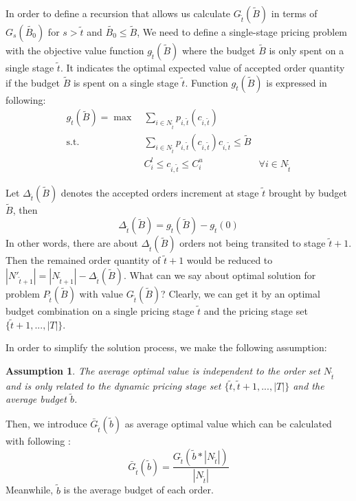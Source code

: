\documentclass[sigconf,authordraft]{acmart}
\begin{document}
  In order to define a recursion that allows us calculate $G_{\tilde{t}}(\tilde{B})$ in terms of $G_{s}(\tilde{B_0})$ for $s>\tilde{t}$ and $\tilde{B_0} \le \tilde{B}$, We need to define a single-stage pricing problem with the objective value function $g_{\tilde{t}}(\tilde{B})$ where the budget $\tilde{B}$ is only spent on a single stage $\tilde{t}$. It indicates the optimal expected value of accepted order quantity if the budget $\tilde{B}$ is spent on a single stage $\tilde{t}$. Function $g_{\tilde{t}}(\tilde{B})$ is expressed in following:
\begin{align}
    \label{eq3.1}g_{\tilde{t}}(\tilde{B})= \max~& \sum_{i\in N_{\tilde{t}}}p_{i,\tilde{t}}(c_{i,\tilde{t}}) \\
    \label{eq3.2}\mbox{s.t. }& \sum_{i\in N_{\tilde{t}}}p_{i,\tilde{t}}(c_{i,\tilde{t}})c_{i,\tilde{t}}\le \tilde{B}\\
    \label{eq3.3}& C_i^l\le c_{i,\tilde{t}}\le C_i^u & \forall i \in N_{\tilde{t}}
\end{align}


Let $\Delta_{\tilde{t}}(\tilde{B})$ denotes the accepted orders increment at stage $\tilde{t}$ brought by budget $\tilde{B}$, then
\begin{equation}
    \Delta_{\tilde{t}}(\tilde{B})=g_{\tilde{t}}(\tilde{B})-g_{\tilde{t}}(0)
\end{equation}
In other words, there are about $\Delta_{\tilde{t}}(\tilde{B})$ orders not being transited to stage $\tilde{t}+1$. Then the remained order quantity of $\tilde{t}+1$ would be reduced to
 $|N'_{\tilde{t}+1}|=|N_{\tilde{t}+1}|- \Delta_{\tilde{t}}(\tilde{B})$. 
What can we say about optimal solution for problem $P_{\tilde{t}}(\tilde{B})$ with value $G_{\tilde{t}}(\tilde{B})$? Clearly, we can get it by an optimal budget combination on a single pricing stage $\tilde{t}$ and the pricing stage set $\{\tilde{t}+1,...,|T|\}$. 

 In order to simplify the solution process, we make the following assumption:
 \newtheorem{assumption}{Assumption}
\begin{assumption}
The average optimal value is independent to the order set $N_{\tilde{t}}$ and is only related to the dynamic pricing stage set $\{\tilde{t},\tilde{t}+1,...,|T|\}$ and the average budget $\tilde{b}$. 
\end{assumption}
Then, we introduce $\bar G_{\tilde{t}}(\tilde{b})$ as average optimal value which can be calculated with following :
\begin{equation}
    \bar G_{\tilde{t}}(\tilde{b})=\frac{G_{\tilde{t}}(\tilde{b}*|N_{\tilde{t}}|)}{|N_{\tilde{t}}|}
\end{equation}
Meanwhile, $\tilde{b}$ is the average budget of each order.
\end{document}
